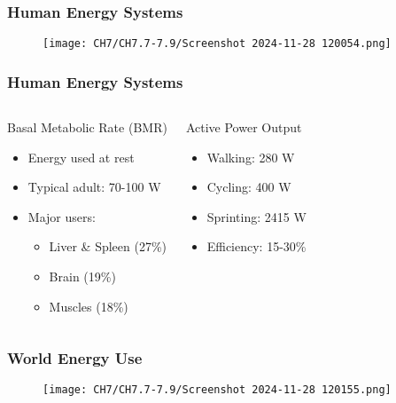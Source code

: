 \documentclass{beamer}
\begin{document}
\begin{frame}
\frametitle{Human Energy Systems}
\begin{figure}
    \centering
    \texttt{[image: CH7/CH7.7-7.9/Screenshot 2024-11-28 120054.png]}
\end{figure}
\end{frame}
\begin{frame}
\frametitle{Human Energy Systems}
\begin{columns}
\begin{block}{Basal Metabolic Rate (BMR)}
\begin{itemize}
\item Energy used at rest
\item Typical adult: 70-100 W
\item Major users:
  \begin{itemize}
  \item Liver \& Spleen (27\%)
  \item Brain (19\%)
  \item Muscles (18\%)
  \end{itemize}
\end{itemize}
\end{block}

\begin{block}{Active Power Output}
\begin{itemize}
\item Walking: 280 W
\item Cycling: 400 W
\item Sprinting: 2415 W
\item Efficiency: 15-30\%
\end{itemize}
\end{block}
\end{columns}
\end{frame}

\begin{frame}
\frametitle{World Energy Use}
\begin{figure}
    \centering
    \texttt{[image: CH7/CH7.7-7.9/Screenshot 2024-11-28 120155.png]}
\end{figure}
\end{frame}
\end{document}
